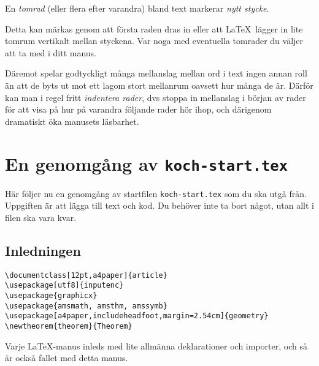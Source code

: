 \sqrt{}\documentclass[a4paper,12pt]{article}
\begin{document}
En \emph{tomrad} (eller flera efter varandra) bland text markerar
\emph{nytt stycke}.

Detta kan märkas genom att första raden dras in eller att \LaTeX\
lägger in lite tomrum vertikalt mellan styckena. Var noga med
eventuella tomrader du väljer att ta med i ditt manus.

Däremot spelar godtyckligt många mellanslag mellan ord i text ingen
annan roll än att de byts ut mot ett lagom stort mellanrum oavsett hur
många de är. Därför kan man i regel fritt \emph{indentera rader}, dvs
stoppa in mellanslag i början av rader för att visa på hur på varandra
följande rader hör ihop, och därigenom dramatiskt öka manusets
läsbarhet. 
%
\begin{center}
  \noindent
\end{center}

\section{En genomgång av \texttt{koch-start.tex}}

Här följer nu en genomgång av startfilen \texttt{koch-start.tex} som
du ska utgå från. Uppgiften är att lägga till text och kod. Du behöver
inte ta bort något, utan allt i filen ska vara kvar.

\subsection{Inledningen}

\begin{Verbatim}[frame=single]
\documentclass[12pt,a4paper]{article}
\usepackage[utf8]{inputenc}
\usepackage{graphicx}
\usepackage{amsmath, amsthm, amssymb}
\usepackage[a4paper,includeheadfoot,margin=2.54cm]{geometry}
\newtheorem{theorem}{Theorem}
\end{Verbatim}

Varje \LaTeX-manus inleds med lite allmänna deklarationer och
importer, och så är också fallet med detta manus.  
\end{document}
